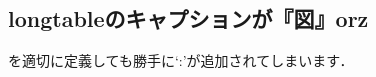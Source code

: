 \subsection{longtableのキャプションが『図』orz}

を適切に定義しても勝手に`:'が追加されてしまいます．

\begin{intext}
\def\LT@makecaption#1#2#3{%
  \LT@mcol\LT@cols c{\hbox to\z@{\hss\parbox[t]\LTcapwidth{%
    \sbox\@tempboxa{#1{#2: }#3}%
    \ifdim\wd\@tempboxa>\hsize
      #1{#2: }#3%
    \else
      \hbox to\hsize{\hfil\box\@tempboxa\hfil}%
    \fi
    \endgraf\vskip\baselineskip}%
  \hss}}}
\end{intext}


\begin{intext}
\def\LT@makecaption#1#2#3{%
  \LT@mcol\LT@cols c{\hbox to\z@%
  {\hss\parbox[t]\LTcapwidth{%
    \sbox\@tempboxa{#1{#2\hskip1zw\relax}#3}%
    \ifdim\wd\@tempboxa>\hsize
      #1{#2\hskip1zw\relax}#3%
    \else%
      \hbox to\hsize{\hfil\box\@tempboxa\hfil}%
    \fi%
    \endgraf\vskip\belowcaptionskip}%
  \hss}}%
}%
\end{intext}
